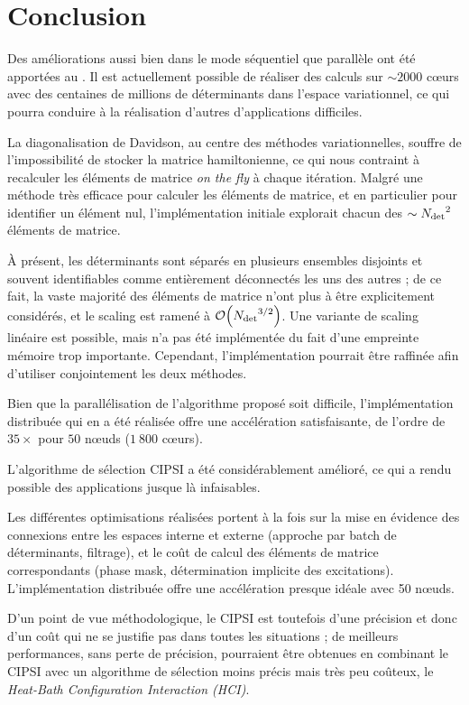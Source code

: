 \documentclass[./thesis.tex]{subfiles}
\begin{document}

\section{Conclusion}

Des améliorations aussi bien dans le mode séquentiel que parallèle ont été apportées au \QP. Il est actuellement possible de réaliser des calculs sur $\sim 2000$ cœurs avec des centaines de millions de déterminants dans l'espace variationnel, ce qui pourra conduire à la réalisation d'autres d'applications difficiles.

La diagonalisation de Davidson, au centre des méthodes variationnelles, souffre de l’impossibilité de stocker la matrice hamiltonienne, ce qui nous contraint à recalculer les éléments de matrice \emph{on the fly} à chaque itération. Malgré une méthode très efficace pour calculer les éléments de matrice,\cite{Scemama_2013} et en particulier pour identifier un élément nul, l'implémentation initiale explorait chacun des $\sim {N_\text{det}}^2$ éléments de matrice.

À présent, les déterminants sont séparés en plusieurs ensembles disjoints et souvent identifiables comme entièrement déconnectés les uns des autres ; de ce fait, la vaste majorité des éléments de matrice n'ont plus à être explicitement considérés, et le scaling est ramené à $\order{\Ndet^{3/2}}$. Une variante de scaling linéaire est possible, mais n'a pas été implémentée du fait d'une empreinte mémoire trop importante. Cependant, l'implémentation pourrait être raffinée afin d'utiliser conjointement les deux méthodes.

Bien que la parallélisation de l'algorithme proposé soit difficile, l'implémentation distribuée qui en a été réalisée offre une accélération satisfaisante, de l'ordre de $35\times$ pour $50$ nœuds ($1~800$ cœurs). 

L'algorithme de sélection CIPSI a été considérablement amélioré, ce qui a rendu possible des applications jusque là infaisables.\cite{Scemama_2018,1806.05115}

Les différentes optimisations réalisées portent à la fois sur la mise en évidence des connexions entre les espaces interne et externe (approche par batch de déterminants, filtrage), et le coût de calcul des éléments de matrice correspondants (phase mask, détermination implicite des excitations).
L'implémentation distribuée offre une accélération presque idéale avec 50 nœuds.

D'un point de vue méthodologique, le CIPSI est toutefois d'une précision et donc d'un coût qui ne se justifie pas dans toutes les situations ; de meilleurs performances, sans perte de précision, pourraient être obtenues en combinant le CIPSI avec un algorithme de sélection moins précis mais très peu coûteux, le \emph{Heat-Bath Configuration Interaction (HCI)}. \cite{Holmes_2016, Sharma_2017}
\end{document}

